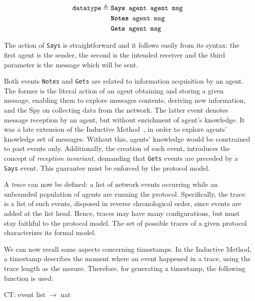 \begin{equation*}
  \begin{split}
    \texttt{datatype} \triangleq\
    & \texttt{\textbf{Says} agent agent msg} \\
    & \texttt{\textbf{Notes} agent msg} \\
    & \texttt{\textbf{Gets} agent msg}
  \end{split}
\end{equation*}

The action of \texttt{Says} is straightforward and it follows easily from its syntax: the first agent is the sender, the second is the intended receiver and the third parameter is the message which will be sent.

Both events \texttt{Notes} and \texttt{Gets} are related to information acquisition by an agent. The former is the literal action of an agent obtaining and storing a given message, enabling them to explore messages contents, deriving new information, and the Spy on collecting data from the network. The latter event denotes message reception by an agent, but without enrichment of agent's knowledge. It was a late extension of the Inductive Method~\cite[Ch. 8]{Bella2007}, in order to explore agents' knowledge set of messages. Without this, agents' knowledge would be constrained to past events only. Additionally, the creation of such event, introduces the concept of \textit{reception invariant}, demanding that \texttt{Gets} events are preceded by a \texttt{Says} event. This guarantee must be enforced by the protocol model.

A \textit{trace} can now be defined: a list of network events occurring while an unbounded population of agents are running the protocol. Specifically, the trace is a list of such events, disposed in reverse chronological order, since events are added at the list head. Hence, traces may have many configurations, but must stay faithful to the protocol model. The set of possible traces of a given protocol characterizes its formal model.

We can now recall some aspects concerning timestamps. In the Inductive Method, a timestamp describes the moment where an event happened in a trace, using the trace length as the mesure. Therefore, for generating a timestamp, the following function is used:

\begin{center}
  {\ttfamily CT\@: event list \(\longrightarrow \) nat}
\end{center}

